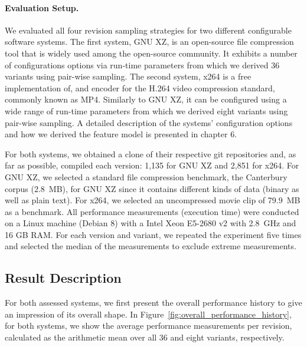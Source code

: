 \paragraph{Evaluation Setup.} We evaluated all four revision sampling strategies
for two different configurable software systems. The first system, GNU XZ, is
an open-source file compression tool that is widely used among the open-source
community. It exhibits a number of configurations options via run-time
parameters from which we derived 36 variants using pair-wise sampling. The
second system, x264 is a free implementation of, and encoder for the H.264
video compression standard, commonly known as MP4. Similarly to GNU XZ, it can
be configured using a wide range of run-time parameters from which we derived
eight variants using pair-wise sampling.  A detailed description of the systems’
configuration options and how we derived the feature model is presented in chapter 6.

For both systems, we obtained a clone of
their respective git repositories and, as far as possible, compiled each
version: 1,135 for GNU XZ and 2,851 for x264. For GNU XZ, we selected a
standard file compression benchmark, the Canterbury corpus (2.8~MB), for GNU XZ
since it contains different kinds of data (binary as well as plain text). For
x264, we selected an uncompressed movie clip of 79.9~MB as a benchmark. All
performance measurements (execution time) were conducted on a Linux machine
(Debian 8) with a Intel Xeon E5-2680 v2 with 2.8~GHz and 16 GB RAM. For each
version and variant, we repeated the experiment five times and selected the
median of the measurements to exclude extreme measurements.

\subsection{Result Description}
For both assessed systems, we first present the overall performance history to
give an impression of its overall shape. In
Figure~\ref{fig:overall_performance_history}, for both systems, we show the
average performance measurements per revision, calculated as the arithmetic
mean over all 36 and eight variants, respectively.

